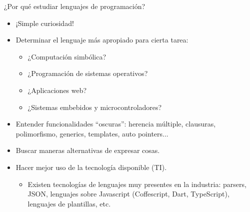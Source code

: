 \documentclass{beamer} %
\begin{document}
\begin{frame}{¿Por qué estudiar lenguajes de programación?}
    \begin{itemize}
      \item<1-> ¡Simple curiosidad!
      \item<2-> Determinar el lenguaje más apropiado para cierta tarea:
      \begin{itemize}
          \item ¿Computación simbólica?
          \item ¿Programación de sistemas operativos?
          \item ¿Aplicaciones web?
          \item ¿Sistemas embebidos y microcontroladores?
      \end{itemize}
      \item<3-> Entender funcionalidades ``oscuras'': herencia múltiple, clausuras, polimorfismo, generics, templates, auto pointers...
      \item<4-> Buscar maneras alternativas de expresar cosas.
      \item<5-> Hacer mejor uso de la tecnología disponible (TI).
      \begin{itemize}
          \item Existen tecnologías de lenguajes muy presentes en la industria: parsers, JSON, lenguajes sobre Javascript (Coffescript, Dart, TypeScript), lenguajes de plantillas, etc.
      \end{itemize}
    \end{itemize}
\end{frame}
\end{document}
